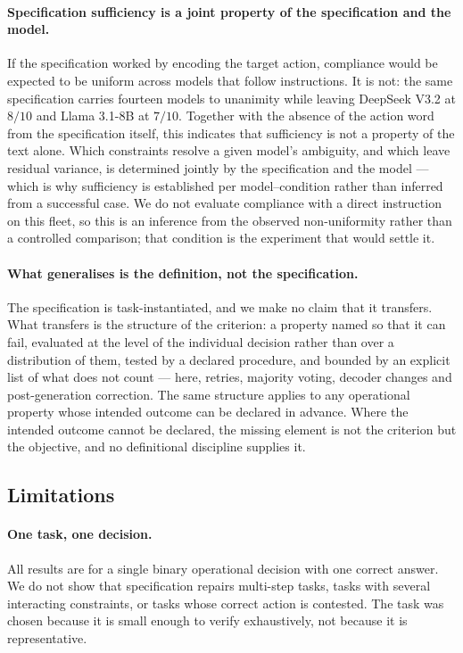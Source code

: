 \paragraph{Specification sufficiency is a joint property of the specification and the model.}
If the specification worked by encoding the target action, compliance would be
expected to be uniform across models that follow instructions. It is not: the same
specification carries fourteen models to unanimity while leaving DeepSeek V3.2 at
$8/10$ and Llama 3.1-8B at $7/10$. Together with the absence of the action word from
the specification itself, this indicates that sufficiency is not a property of the
text alone. Which constraints resolve a given model's ambiguity, and which leave
residual variance, is determined jointly by the specification and the model --- which
is why sufficiency is established per model--condition rather than inferred from a
successful case. We do not evaluate compliance with a direct instruction on this
fleet, so this is an inference from the observed non-uniformity rather than a
controlled comparison; that condition is the experiment that would settle it.

\paragraph{What generalises is the definition, not the specification.}
The specification is task-instantiated, and we make no claim that it transfers. What
transfers is the structure of the criterion: a property named so that it can fail,
evaluated at the level of the individual decision rather than over a distribution of
them, tested by a declared procedure, and bounded by an explicit list of what does not
count --- here, retries, majority voting, decoder changes and post-generation
correction. The same structure applies to any operational property whose intended
outcome can be declared in advance. Where the intended outcome cannot be declared, the
missing element is not the criterion but the objective, and no definitional discipline
supplies it.

\subsection{Limitations}

\paragraph{One task, one decision.}
All results are for a single binary operational decision with one correct answer.
We do not show that specification repairs multi-step tasks, tasks with several
interacting constraints, or tasks whose correct action is contested. The task was
chosen because it is small enough to verify exhaustively, not because it is
representative.

